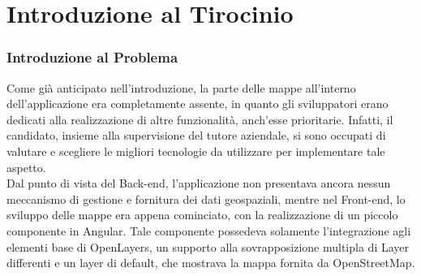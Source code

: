 \chapter{Introduzione al Tirocinio}

\subsection{Introduzione al Problema}

Come già anticipato nell'introduzione, la parte delle mappe all'interno dell'applicazione era completamente assente, in quanto gli sviluppatori erano dedicati alla realizzazione di altre funzionalità, anch'esse prioritarie. Infatti, il candidato, insieme alla supervisione del tutore aziendale, si sono occupati di valutare e scegliere le migliori tecnologie da utilizzare per implementare tale aspetto.
\\Dal punto di vista del Back-end, l'applicazione non presentava ancora nessun meccanismo di gestione e fornitura dei dati geospaziali, mentre nel Front-end, lo sviluppo delle mappe era appena cominciato, con la realizzazione di un piccolo componente in Angular. Tale componente possedeva solamente l'integrazione agli elementi base di OpenLayers, un supporto alla sovrapposizione multipla di Layer differenti e un layer di default, che mostrava la mappa fornita da OpenStreetMap.







